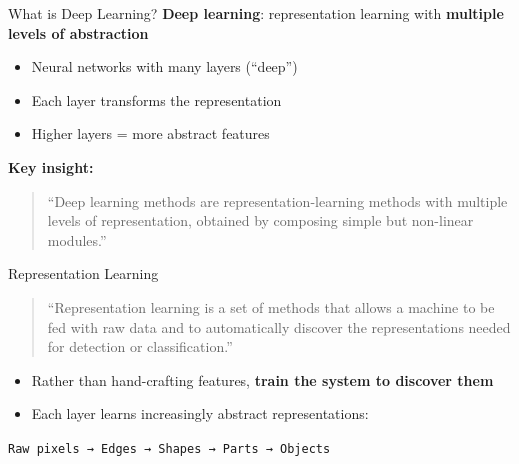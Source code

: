 \begin{frame}{What is Deep Learning?}
    \textbf{Deep learning}: representation learning with \textbf{multiple levels of abstraction}
    
    \vspace{1em}
    \begin{itemize}
        \item Neural networks with many layers (``deep'')
        \item Each layer transforms the representation
        \item Higher layers = more abstract features
    \end{itemize}
    
    \vspace{1em}
    \textbf{Key insight:}
    \begin{quote}
        ``Deep learning methods are representation-learning methods with multiple levels of representation, obtained by composing simple but non-linear modules.''
    \end{quote}
\end{frame}

\begin{frame}{Representation Learning}
    \begin{quote}
        ``Representation learning is a set of methods that allows a machine to be fed with raw data and to automatically discover the representations needed for detection or classification.''
    \end{quote}
    
    \vspace{1em}
    \begin{itemize}
        \item Rather than hand-crafting features, \textbf{train the system to discover them}
        \item Each layer learns increasingly abstract representations:
    \end{itemize}
    
    \begin{center}
        \texttt{Raw pixels → Edges → Shapes → Parts → Objects}
    \end{center}
\end{frame}

